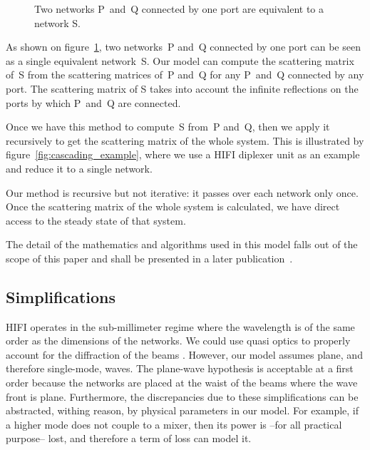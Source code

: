 \documentclass[journal]{IEEEtran}
\begin{document}
\begin{figure}
    \centering
    
    \caption{\label{fig:cascading}Two networks P~and~Q connected by one port are equivalent to a network S.}
\end{figure}

As shown on figure~\ref{fig:cascading}, two networks~P and~Q connected by one port can be seen as a single equivalent network~S.
Our model can compute the scattering matrix of~S from the scattering matrices of~P and~Q for any P~and~Q connected by any port.
The scattering matrix of S takes into account the infinite reflections on the ports by which P~and~Q are connected.

Once we have this method to compute~S from~P and~Q, then we apply it recursively to get the scattering matrix of the whole system.
This is illustrated by figure~\ref{fig:cascading_example}, where we use a HIFI diplexer unit as an example and reduce it to a single network.



Our method is recursive but not iterative: it passes over each network only once.
Once the scattering matrix of the whole system is calculated, we have direct access to the steady state of that system.

The detail of the mathematics and algorithms used in this model falls out of the scope of this paper and shall be presented in a later publication~\cite{delforge_2014_phdthesis}.



\subsection{Simplifications}

HIFI operates in the sub-millimeter regime where the wavelength is of the same order as the dimensions of the networks.
We could use quasi optics to properly account for the diffraction of the beams \cite{goldsmith1998quasioptical}.
However, our model assumes plane, and therefore single-mode, waves.
The plane-wave hypothesis is acceptable at a first order because the networks are placed at the waist of the beams where the wave front is plane.
Furthermore, the discrepancies due to these simplifications can be abstracted, withing reason, by physical parameters in our model.
For example, if a higher mode does not couple to a mixer, then its power is --for all practical purpose-- lost, and therefore a term of loss can model it.
\end{document}
